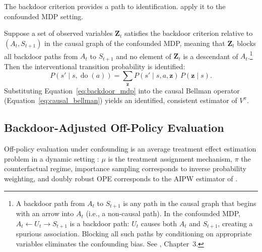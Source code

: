 The backdoor criterion \citep{pearl2009causality} provides a path to identification. \citet{zhang2020causal} apply it to the confounded MDP setting.

\begin{theorem}
\label{thm:backdoor_mdp}
Suppose a set of observed variables $\mathbf{Z}_t$ satisfies the backdoor criterion relative to $(A_t, S_{t+1})$ in the causal graph of the confounded MDP, meaning that $\mathbf{Z}_t$ blocks all backdoor paths from $A_t$ to $S_{t+1}$ and no element of $\mathbf{Z}_t$ is a descendant of $A_t$.\footnote{A backdoor path from $A_t$ to $S_{t+1}$ is any path in the causal graph that begins with an arrow into $A_t$ (i.e., a non-causal path). In the confounded MDP, $A_t \leftarrow U_t \rightarrow S_{t+1}$ is a backdoor path: $U_t$ causes both $A_t$ and $S_{t+1}$, creating a spurious association. Blocking all such paths by conditioning on appropriate variables eliminates the confounding bias. See \citet{pearl2009causality}, Chapter~3.} Then the interventional transition probability is identified:
\begin{equation}
P(s' \mid s, \operatorname{do}(a)) = \sum_{\mathbf{z}} P(s' \mid s, a, \mathbf{z}) \, P(\mathbf{z} \mid s).
\label{eq:backdoor_mdp}
\end{equation}
Substituting Equation~\eqref{eq:backdoor_mdp} into the causal Bellman operator (Equation~\ref{eq:causal_bellman}) yields an identified, consistent estimator of $V^\pi$.
\end{theorem}

\subsection{Backdoor-Adjusted Off-Policy Evaluation}
\label{subsec:backdoor_ope}

Off-policy evaluation under confounding is an average treatment effect estimation problem in a dynamic setting \citep{bannon2020causality}: $\mu$ is the treatment assignment mechanism, $\pi$ the counterfactual regime, importance sampling corresponds to inverse probability weighting, and doubly robust OPE corresponds to the AIPW estimator of \citet{robins1994estimation}.

